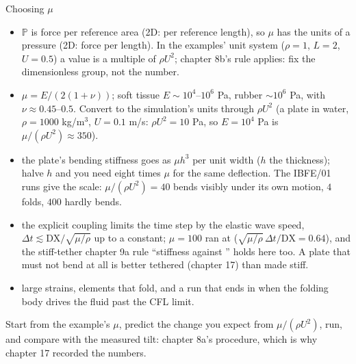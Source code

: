 \documentclass[aspectratio=169,11pt]{beamer}
\begin{document}
\begin{frame}{Choosing $\mu$}
\label{fr:choosemu}
\footnotesize
\begin{itemize}
  \item {} $\mathbb{P}$ is force per reference area (2D: per reference length), so $\mu$ has the units of a pressure (2D: force per length). In the examples' unit system ($\rho = 1$, $L = 2$, $U = 0.5$) a value is a multiple of $\rho U^2$; chapter 8b's rule applies: fix the dimensionless group, not the number.
  \item {} $\mu = E/(2(1+\nu))$; soft tissue $E \sim 10^4$--$10^6$ Pa, rubber $\sim 10^6$ Pa, with $\nu \approx 0.45$--$0.5$. Convert to the simulation's units through $\rho U^2$ (a plate in water, $\rho = 1000$ kg/m$^3$, $U = 0.1$ m/s: $\rho U^2 = 10$ Pa, so $E = 10^4$ Pa is $\mu/(\rho U^2) \approx 350$).
  \item {} the plate's bending stiffness goes as $\mu h^3$ per unit width ($h$ the thickness); halve $h$ and you need eight times $\mu$ for the same deflection. The IBFE/01 runs give the scale: $\mu/(\rho U^2) = 40$ bends visibly under its own motion, $4$ folds, $400$ hardly bends.
  \item {} the explicit coupling limits the time step by the elastic wave speed, $\Delta t \lesssim \mathrm{DX}/\sqrt{\mu/\rho}$ up to a constant; $\mu = 100$ ran at  ($\sqrt{\mu/\rho}\,\Delta t/\mathrm{DX} = 0.64$), and the stiff-tether chapter 9a rule ``stiffness against '' holds here too. A plate that must not bend at all is better tethered (chapter 17) than made stiff.
  \item {} large strains, elements that fold, and a run that ends in  when the folding body drives the fluid past the CFL limit.
\end{itemize}
\begin{punchbox}
\footnotesize Start from the example's $\mu$, predict the change you expect from $\mu/(\rho U^2)$, run, and compare with the measured tilt: chapter 8a's procedure, which is why chapter 17 recorded the numbers.
\end{punchbox}
\end{frame}
\end{document}

